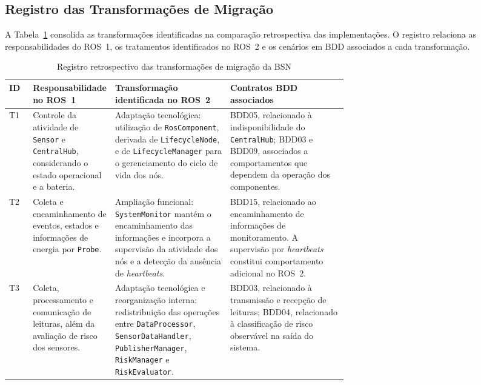 \subsection{Registro das Transformações de Migração}
\label{subsec:res-planejamento-registro}

A Tabela~\ref{tab:res-migration-record} consolida as transformações identificadas na comparação retrospectiva das implementações. O registro relaciona as responsabilidades do ROS~1, os tratamentos identificados no ROS~2 e os cenários em BDD associados a cada transformação.


\begin{table}[htbp]
\centering
\caption{Registro retrospectivo das transformações de migração da BSN}
\label{tab:res-migration-record}
\scriptsize

\begin{tabularx}{\linewidth}{@{}
p{0.07\linewidth}
p{0.24\linewidth}
p{0.34\linewidth}
X@{}}
\toprule

\textbf{ID} &
\textbf{Responsabilidade no ROS~1} &
\textbf{Transformação identificada no ROS~2} &
\textbf{Contratos BDD associados} \\

\midrule

T1 &
Controle da atividade de \texttt{Sensor} e
\texttt{CentralHub}, considerando o estado
operacional e a bateria. &
Adaptação tecnológica: utilização de
\texttt{RosComponent}, derivada de
\texttt{LifecycleNode}, e de
\texttt{LifecycleManager} para o
gerenciamento do ciclo de vida dos nós. &
BDD05, relacionado à indisponibilidade
do \texttt{CentralHub}; BDD03 e BDD09,
associados a comportamentos que dependem
da operação dos componentes. \\

\addlinespace

T2 &
Coleta e encaminhamento de eventos,
estados e informações de energia por
\texttt{Probe}. &
Ampliação funcional: \texttt{SystemMonitor}
mantém o encaminhamento das informações
e incorpora a supervisão da atividade
dos nós e a detecção da ausência de
\textit{heartbeats}. &
BDD15, relacionado ao encaminhamento
de informações de monitoramento.
A supervisão por \textit{heartbeats}
constitui comportamento adicional
no ROS~2. \\

\addlinespace

T3 &
Coleta, processamento e comunicação
de leituras, além da avaliação
de risco dos sensores. &
Adaptação tecnológica e reorganização
interna: redistribuição das operações
entre \texttt{DataProcessor},
\texttt{SensorDataHandler},
\texttt{PublisherManager},
\texttt{RiskManager} e
\texttt{RiskEvaluator}. &
BDD03, relacionado à transmissão
e recepção de leituras; BDD04,
relacionado à classificação de risco
observável na saída do sistema. \\

\bottomrule
\end{tabularx}
\end{table}



